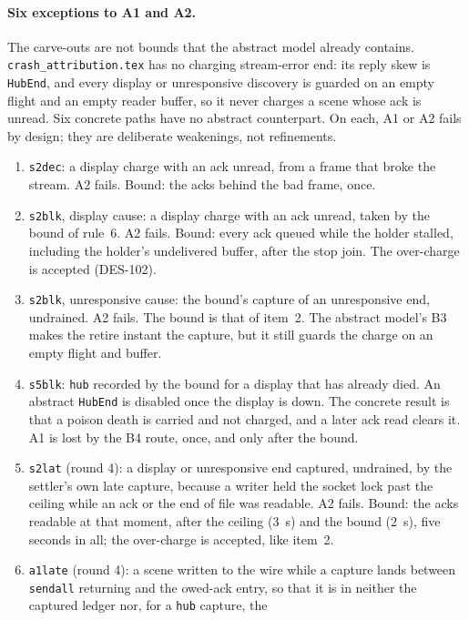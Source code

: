 \documentclass[a4paper,10pt,fleqn]{article}
\begin{document}
\paragraph{Six exceptions to A1 and A2.}
The carve-outs are not bounds that the abstract model already contains.
\texttt{crash\_attribution.tex} has no charging stream-error end: its reply skew
is \texttt{HubEnd}, and every display or unresponsive discovery is guarded on an
empty flight and an empty reader buffer, so it never charges a scene whose ack
is unread.  Six concrete paths have no abstract counterpart.  On each, A1 or A2
fails by design; they are deliberate weakenings, not refinements.
\begin{enumerate}
  \item \texttt{s2dec}: a display charge with an ack unread, from a frame that
    broke the stream.  A2 fails.  Bound: the acks behind the bad frame, once.
  \item \texttt{s2blk}, display cause: a display charge with an ack unread,
    taken by the bound of rule~6.  A2 fails.  Bound: every ack queued while the
    holder stalled, including the holder's undelivered buffer, after the stop
    join.  The over-charge is accepted (DES-102).
  \item \texttt{s2blk}, unresponsive cause: the bound's capture of an
    unresponsive end, undrained.  A2 fails.  The bound is that of item~2.  The
    abstract model's B3 makes the retire instant the capture, but it still
    guards the charge on an empty flight and buffer.
  \item \texttt{s5blk}: \texttt{hub} recorded by the bound for a display that has
    already died.  An abstract \texttt{HubEnd} is disabled once the display is
    down.  The concrete result is that a poison death is carried and not charged,
    and a later ack read clears it.  A1 is lost by the B4 route, once, and only
    after the bound.
  \item \texttt{s2lat} (round 4): a display or unresponsive end captured, undrained,
    by the settler's own late capture, because a writer held the socket lock
    past the ceiling while an ack or the end of file was readable.  A2 fails.
    Bound: the acks readable at that moment, after the ceiling (3~s) and the
    bound (2~s), five seconds in all; the over-charge is accepted, like item~2.
  \item \texttt{a1late} (round 4): a scene written to the wire while a capture
    lands between \texttt{sendall} returning and the owed-ack entry, so that it
    is in neither the captured ledger nor, for a \texttt{hub} capture, the

\end{enumerate}
\end{document}
